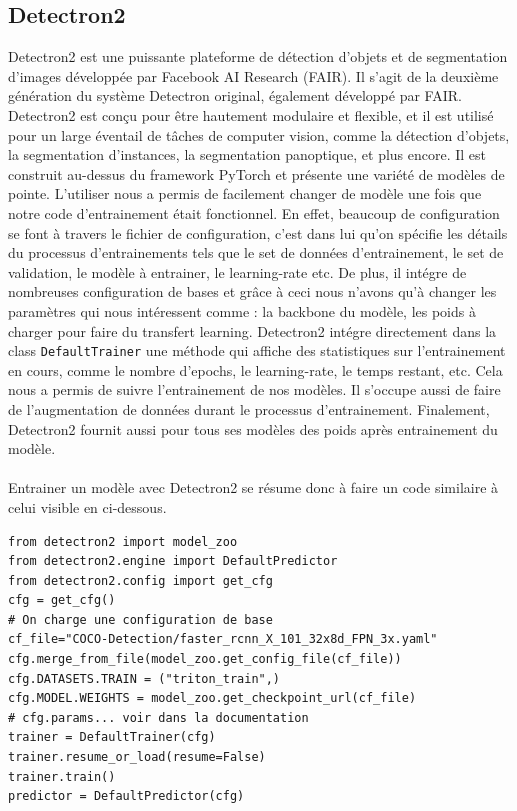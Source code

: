 \subsection{Detectron2}
Detectron2 est une puissante plateforme de détection d'objets et de segmentation d'images développée par Facebook AI Research (FAIR). Il s'agit de la deuxième génération du système Detectron original, également développé par FAIR. Detectron2 est conçu pour être hautement modulaire et flexible, et il est utilisé pour un large éventail de tâches de computer vision, comme la détection d'objets, la segmentation d'instances, la segmentation panoptique, et plus encore. Il est construit au-dessus du framework PyTorch et présente une variété de modèles de pointe. L'utiliser nous a permis de facilement changer de modèle une fois que notre code d'entrainement était fonctionnel.
En effet, beaucoup de configuration se font à travers le fichier de configuration, c'est dans lui qu'on spécifie les détails du processus d'entrainements tels que le set de données d'entrainement, le set de validation, le modèle à entrainer, le learning-rate etc. De plus, il intégre de nombreuses configuration de bases et grâce à ceci nous n'avons qu'à changer les paramètres qui nous intéressent comme : la backbone du modèle, les poids à charger pour faire du transfert learning. Detectron2 intégre directement dans la class \verb|DefaultTrainer| une méthode qui affiche des statistiques sur l'entrainement en cours, comme le nombre d'epochs, le learning-rate, le temps restant, etc. Cela nous a permis de suivre l'entrainement de nos modèles. Il s'occupe aussi de faire de l'augmentation de données durant le processus d'entrainement. Finalement, Detectron2 fournit aussi pour tous ses modèles des poids après entrainement du modèle.
\paragraph{}
Entrainer un modèle avec Detectron2 se résume donc à faire un code similaire à celui visible en ci-dessous.
\lstset{language=Python}
\begin{lstlisting}
from detectron2 import model_zoo
from detectron2.engine import DefaultPredictor
from detectron2.config import get_cfg
cfg = get_cfg()
# On charge une configuration de base
cf_file="COCO-Detection/faster_rcnn_X_101_32x8d_FPN_3x.yaml"
cfg.merge_from_file(model_zoo.get_config_file(cf_file))
cfg.DATASETS.TRAIN = ("triton_train",)
cfg.MODEL.WEIGHTS = model_zoo.get_checkpoint_url(cf_file)  
# cfg.params... voir dans la documentation
trainer = DefaultTrainer(cfg) 
trainer.resume_or_load(resume=False)
trainer.train()
predictor = DefaultPredictor(cfg)
\end{lstlisting}
